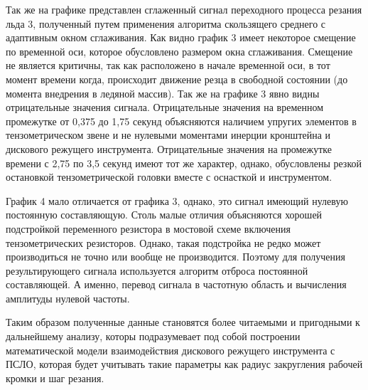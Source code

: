 	Так же на графике представлен сглаженный сигнал переходного процесса резания льда 3, полученный путем применения алгоритма скользящего среднего с адаптивным окном сглаживания. Как видно график 3 имеет некоторое смещение по временной оси, которое обусловлено размером окна сглаживания. Смещение не является критичны, так как расположено в начале временной оси, в тот момент времени когда, происходит движение резца в свободной состоянии (до момента внедрения в ледяной массив). Так же на графике 3 явно видны отрицательные значения сигнала. Отрицательные значения на временном промежутке от 0,375 до 1,75 секунд объясняются наличием упругих элементов в тензометрическом звене и не нулевыми моментами инерции кронштейна и дискового режущего инструмента. Отрицательные значения на промежутке времени с 2,75 по 3,5 секунд имеют тот же характер, однако, обусловлены резкой остановкой тензометрической головки вместе с оснасткой и инструментом.

	График 4 мало отличается от графика 3, однако, это сигнал имеющий нулевую постоянную составляющую. Столь малые отличия объясняются хорошей подстройкой переменного резистора в мостовой схеме включения тензометрических резисторов. Однако, такая подстройка не редко может производиться не точно или вообще не производится. Поэтому для получения результирующего сигнала используется алгоритм отброса постоянной составляющей. А именно, перевод сигнала в частотную область и вычисления амплитуды нулевой частоты.

	Таким образом полученные данные становятся более читаемыми и пригодными к дальнейшему анализу, которы подразумевает под собой построении математической модели взаимодействия дискового режущего инструмента с ПСЛО, которая будет учитывать такие параметры как радиус закругления рабочей кромки и шаг резания.